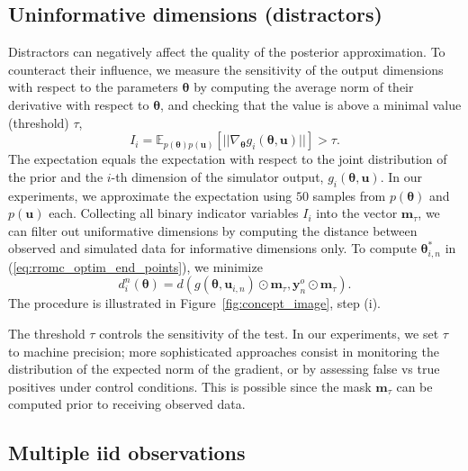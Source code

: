 \documentclass[twoside]{article}
\newcommand{\thb}{\boldsymbol{\theta}}
\newcommand{\ub}{\mathbf{u}}
\newcommand{\data}{\mathbf{y}^o}
\newcommand{\E}{\mathbb{E}}
\newcommand{\mask}{\mathbf{m}_\tau}
\begin{document}
\subsection{Uninformative dimensions (distractors)}
\label{subsec:distractors}
Distractors can negatively affect the quality of the posterior approximation. To counteract their influence, we measure the sensitivity of the output dimensions with respect to the parameters $\thb$ by computing the average norm of their derivative with respect to $\thb$, and checking that the value is above a minimal value (threshold) $\tau$, 
\begin{equation}
  \label{eq:informative_dimensions}
  I_i = \E_{p(\thb)p(\ub)}\left[ || \nabla_{\thb} g_i(\thb, \ub) || \right] > \tau.
\end{equation}
The expectation equals the expectation with respect to the joint distribution of the prior and the $i$-th dimension of the simulator output, $g_i(\thb, \ub)$. In our experiments, we approximate the expectation using $50$ samples from $p(\thb)$ and $p(\ub)$ each. Collecting all binary indicator variables $I_i$ into the vector $\mask$, we can filter out uniformative dimensions by computing the distance between observed and simulated data for informative dimensions only. To compute $\thb_{i,n}^*$ in (\ref{eq:rromc_optim_end_points}), we minimize
\begin{equation}
d_i^n(\thb) = d(g(\thb, \ub_{i,n})\odot \mask, \data_n \odot \mask).
\label{eq:rromc-masked-distance}
\end{equation}
The procedure is illustrated in Figure~\ref{fig:concept_image}, step (i). 

The threshold $\tau$ controls the sensitivity of the test. In our experiments, we set $\tau$ to machine precision; more sophisticated approaches consist in monitoring the distribution of the expected norm of the gradient, or by assessing false vs true positives under control conditions. This is possible since the mask $\mask$ can be computed prior to receiving observed data.

\subsection{Multiple iid observations}
\label{subsec:multiple-observations}
\end{document}
